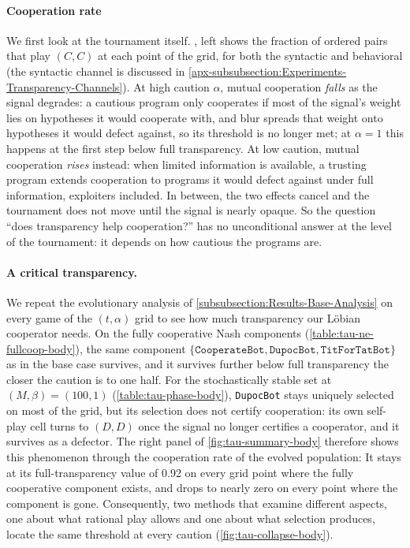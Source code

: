 \documentclass[twoside,11pt]{article}
\begin{document}
\paragraph{Cooperation rate}
We first look at the tournament itself. , left shows the fraction of ordered pairs that play $(C,C)$ at each point of the grid, for both the syntactic and behavioral (the syntactic channel is discussed in \cref{apx-subsubsection:Experiments-Transparency-Channels}). At high caution $\alpha$, mutual cooperation \emph{falls} as the signal degrades: a cautious program only cooperates if most of the signal's weight lies on hypotheses it would cooperate with, and blur spreads that weight onto hypotheses it would defect against, so its threshold is no longer met; at $\alpha = 1$ this happens at the first step below full transparency. At low caution, mutual cooperation \emph{rises} instead: when limited information is available, a trusting program extends cooperation to programs it would defect against under full information, exploiters included. In between, the two effects cancel and the tournament does not move until the signal is nearly opaque. So the question \enquote{does transparency help cooperation?} has no unconditional answer at the level of the tournament: it depends on how cautious the programs are.

\paragraph{A critical transparency.}
We repeat the evolutionary analysis of \cref{subsubsection:Results-Base-Analysis} on every game of the $(t,\alpha)$ grid to see how much transparency our Löbian cooperator needs. On the fully cooperative Nash components (\cref{table:tau-ne-fullcoop-body}), the same component $\{\texttt{CooperateBot}, \texttt{DupocBot}, \texttt{TitForTatBot}\}$ as in the base case survives, and it survives further below full transparency the closer the caution is to one half. For the stochastically stable set at $(M,\beta) = (100,1)$ (\cref{table:tau-phase-body}), \texttt{DupocBot} stays uniquely selected on most of the grid, but its selection does not certify cooperation: its own self-play cell turns to $(D,D)$ once the signal no longer certifies a cooperator, and it survives as a defector. The right panel of \cref{fig:tau-summary-body} therefore shows this phenomenon through the cooperation rate of the evolved population: It stays at its full-transparency value of 0.92 on every grid point where the fully cooperative component exists, and drops to nearly zero on every point where the component is gone. Consequently, two methods that examine different aspects, one about what rational play allows and one about what selection produces, locate the same threshold at every caution (\cref{fig:tau-collapse-body}).
\end{document}
